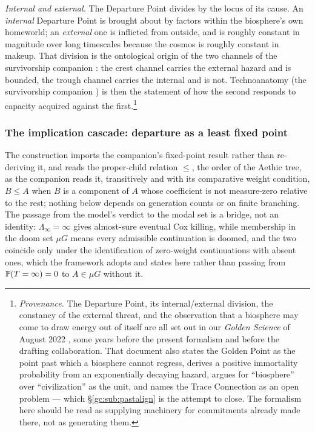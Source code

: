 \begin{definition}
\emph{Internal and external.} The Departure Point divides by the
locus of its cause. An \emph{internal} Departure Point is brought about
by factors within the biosphere's own homeworld; an \emph{external} one
is inflicted from outside, and is roughly constant in magnitude over
long timescales because the cosmos is roughly constant in makeup. That
division is the ontological origin of the two channels of
the survivorship companion \cite{GoldenSurvivorship}: the crest channel carries the external hazard and
is bounded, the trough channel carries the internal and is not.
Technoanatomy (the survivorship companion \cite{GoldenSurvivorship}) is then the statement
of how the second responds to capacity acquired against the
first.\footnote{\emph{Provenance.} The Departure Point, its
internal/external division, the constancy of the external threat, and
the observation that a biosphere may come to draw energy out of itself
are all set out in our \emph{Golden Science} of August 2022
\cite{GoldenScience2022}, some years before the present formalism and
before the drafting collaboration. That document also states the Golden Point as the point
past which a biosphere cannot regress, derives a positive immortality
probability from an exponentially decaying hazard, argues for
``biosphere'' over ``civilization'' as the unit, and names the Trace
Connection as an open problem --- which \S\ref{gc:sub:pastalign} is the
attempt to close. The formalism here should be read as supplying
machinery for commitments already made there, not as generating
them.}
\end{definition}

\subsubsection{The implication cascade: departure as a least fixed point}
\label{gc:subsub:cascade}

The construction imports the companion's fixed-point result rather
than re-deriving it, and reads the proper-child relation $\le$, the order of the Aethic tree, as the companion reads it, transitively and with its comparative weight condition, $B \le A$ when $B$ is a component of $A$ whose coefficient is not measure-zero relative to the rest; nothing below depends on
generation counts or on finite branching. The passage from the model's
verdict to the modal set is a bridge, not an identity: $\Lambda_\infty=\infty$ gives almost-sure eventual Cox
killing, while membership in the doom set $\mu G$ means every
admissible continuation is doomed, and the two coincide only under the
identification of zero-weight continuations with absent ones, which
the framework adopts and states here rather than passing from
$\mathbb{P}(T=\infty)=0$ to $A\in\mu G$ without it.

